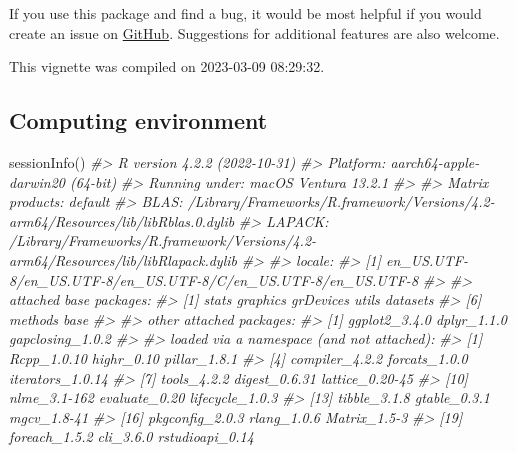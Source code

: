 \documentclass[
]{article}
\newenvironment{Shaded}{\begin{snugshade}}{\end{snugshade}}
\newcommand{\CommentTok}[1]{\textcolor[rgb]{0.56,0.35,0.01}{\textit{#1}}}
\newcommand{\FunctionTok}[1]{\textcolor[rgb]{0.00,0.00,0.00}{#1}}
\newcommand{\NormalTok}[1]{#1}
\begin{document}
If you use this package and find a bug, it would be most helpful if you would create an issue on \href{https://github.com/ilundberg/gapclosing}{GitHub}. Suggestions for additional features are also welcome.

This vignette was compiled on 2023-03-09 08:29:32.

\hypertarget{computing-environment}{%
\subsection{Computing environment}\label{computing-environment}}

\begin{Shaded}
\begin{Highlighting}[]
\FunctionTok{sessionInfo}\NormalTok{()}
\CommentTok{\#\textgreater{} R version 4.2.2 (2022{-}10{-}31)}
\CommentTok{\#\textgreater{} Platform: aarch64{-}apple{-}darwin20 (64{-}bit)}
\CommentTok{\#\textgreater{} Running under: macOS Ventura 13.2.1}
\CommentTok{\#\textgreater{} }
\CommentTok{\#\textgreater{} Matrix products: default}
\CommentTok{\#\textgreater{} BLAS:   /Library/Frameworks/R.framework/Versions/4.2{-}arm64/Resources/lib/libRblas.0.dylib}
\CommentTok{\#\textgreater{} LAPACK: /Library/Frameworks/R.framework/Versions/4.2{-}arm64/Resources/lib/libRlapack.dylib}
\CommentTok{\#\textgreater{} }
\CommentTok{\#\textgreater{} locale:}
\CommentTok{\#\textgreater{} [1] en\_US.UTF{-}8/en\_US.UTF{-}8/en\_US.UTF{-}8/C/en\_US.UTF{-}8/en\_US.UTF{-}8}
\CommentTok{\#\textgreater{} }
\CommentTok{\#\textgreater{} attached base packages:}
\CommentTok{\#\textgreater{} [1] stats     graphics  grDevices utils     datasets }
\CommentTok{\#\textgreater{} [6] methods   base     }
\CommentTok{\#\textgreater{} }
\CommentTok{\#\textgreater{} other attached packages:}
\CommentTok{\#\textgreater{} [1] ggplot2\_3.4.0    dplyr\_1.1.0      gapclosing\_1.0.2}
\CommentTok{\#\textgreater{} }
\CommentTok{\#\textgreater{} loaded via a namespace (and not attached):}
\CommentTok{\#\textgreater{}  [1] Rcpp\_1.0.10       highr\_0.10        pillar\_1.8.1     }
\CommentTok{\#\textgreater{}  [4] compiler\_4.2.2    forcats\_1.0.0     iterators\_1.0.14 }
\CommentTok{\#\textgreater{}  [7] tools\_4.2.2       digest\_0.6.31     lattice\_0.20{-}45  }
\CommentTok{\#\textgreater{} [10] nlme\_3.1{-}162      evaluate\_0.20     lifecycle\_1.0.3  }
\CommentTok{\#\textgreater{} [13] tibble\_3.1.8      gtable\_0.3.1      mgcv\_1.8{-}41      }
\CommentTok{\#\textgreater{} [16] pkgconfig\_2.0.3   rlang\_1.0.6       Matrix\_1.5{-}3     }
\CommentTok{\#\textgreater{} [19] foreach\_1.5.2     cli\_3.6.0         rstudioapi\_0.14  }

\end{Highlighting}
\end{Shaded}
\end{document}
